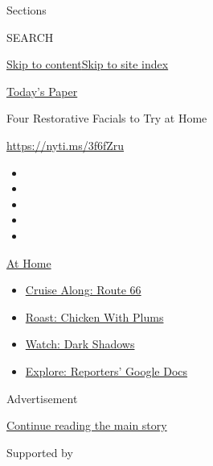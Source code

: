 Sections

SEARCH

\protect\hyperlink{site-content}{Skip to
content}\protect\hyperlink{site-index}{Skip to site index}

\href{https://myaccount.nytimes3xbfgragh.onion/auth/login?response_type=cookie\&client_id=vi}{}

\href{https://www.nytimes3xbfgragh.onion/section/todayspaper}{Today's
Paper}

Four Restorative Facials to Try at Home

\url{https://nyti.ms/3f6fZru}

\begin{itemize}
\item
\item
\item
\item
\item
\end{itemize}

\href{https://www.nytimes3xbfgragh.onion/spotlight/at-home?action=click\&pgtype=Article\&state=default\&region=TOP_BANNER\&context=at_home_menu}{At
Home}

\begin{itemize}
\tightlist
\item
  \href{https://www.nytimes3xbfgragh.onion/2020/09/07/travel/route-66.html?action=click\&pgtype=Article\&state=default\&region=TOP_BANNER\&context=at_home_menu}{Cruise
  Along: Route 66}
\item
  \href{https://www.nytimes3xbfgragh.onion/2020/09/04/dining/sheet-pan-chicken.html?action=click\&pgtype=Article\&state=default\&region=TOP_BANNER\&context=at_home_menu}{Roast:
  Chicken With Plums}
\item
  \href{https://www.nytimes3xbfgragh.onion/2020/09/04/arts/television/dark-shadows-stream.html?action=click\&pgtype=Article\&state=default\&region=TOP_BANNER\&context=at_home_menu}{Watch:
  Dark Shadows}
\item
  \href{https://www.nytimes3xbfgragh.onion/interactive/2020/at-home/even-more-reporters-editors-diaries-lists-recommendations.html?action=click\&pgtype=Article\&state=default\&region=TOP_BANNER\&context=at_home_menu}{Explore:
  Reporters' Google Docs}
\end{itemize}

Advertisement

\protect\hyperlink{after-top}{Continue reading the main story}

Supported by

